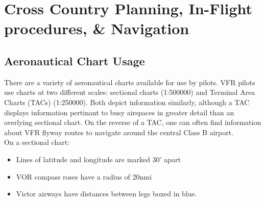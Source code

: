 \documentclass[12pt]{article}
\begin{document}
\section{Cross Country Planning, In-Flight procedures, \& Navigation}
	\subsection{Aeronautical Chart Usage}
		There are a variety of aeronautical charts available for use by pilots. VFR pilots use charts at two different scales: sectional charts (1:500000) and Terminal Area Charts (TACs) (1:250000). Both depict information similarly, although a TAC displays information pertinant to busy airspaces in greater detail than an overlying sectional chart. On the reverse of a TAC, one can often find information about VFR flyway routes to navigate around the central Class B airport.\\ 

		On a sectional chart:
			\begin{itemize}
				\item Lines of latitude and longitude are marked 30' apart
				\item VOR compass roses have a radius of 20nmi
				\item Victor airways have distances between legs boxed in blue. 
			\end{itemize}
\end{document}
